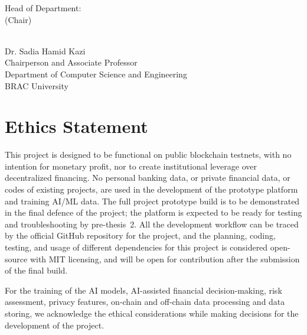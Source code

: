 \documentclass[12pt,a4paper]{report}
\begin{document}
\begin{flushleft}
Head of Department:\\
(Chair)
\end{flushleft}

\begin{flushright}
\vspace{-0.5cm}
\hrulefill\\
Dr. Sadia Hamid Kazi\\
Chairperson and Associate Professor\\
Department of Computer Science and Engineering\\
BRAC University
\end{flushright}

\vspace*{\fill}

\newpage
\thispagestyle{empty}

\chapter*{Ethics Statement}
{}

This project is designed to be functional on public blockchain testnets, with no intention for monetary profit, nor to create institutional leverage over decentralized financing. No personal banking data, or private financial data, or codes of existing projects, are used in the development of the prototype platform and training AI/ML data. The full project prototype build is to be demonstrated in the final defence of the project; the platform is expected to be ready for testing and troubleshooting by pre-thesis~2. All the development workflow can be traced by the official GitHub repository for the project, and the planning, coding, testing, and usage of different dependencies for this project is considered open-source with MIT licensing, and will be open for contribution after the submission of the final build.

For the training of the AI models, AI-assisted financial decision-making, risk assessment, privacy features, on-chain and off-chain data processing and data storing, we acknowledge the ethical considerations while making decisions for the development of the project.

\newpage
\thispagestyle{empty}
\end{document}
